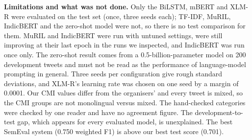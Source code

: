 \documentclass{nle}
\begin{document}
\textbf{Limitations and what was not done.} Only the BiLSTM, mBERT and XLM-R were evaluated on the test set (once, three seeds each); TF-IDF, MuRIL, IndicBERT and the zero-shot model were not, so there is no test comparison for them. MuRIL and IndicBERT were run with untuned settings, were still improving at their last epoch in the
runs we inspected, and IndicBERT was run once only. The zero-shot result comes from a
0.5-billion-parameter model on 200 development tweets and must not be read as the performance of language-model prompting in
general. Three seeds per configuration give rough standard deviations, and XLM-R's learning rate was chosen on one seed by a
margin of 0.0001. Our CMI values differ from the organisers' and every tweet is mixed, so the CMI groups are not monolingual
versus mixed. The hand-checked categories were checked by one reader and have no agreement figure. The development-to-test gap, which appears for every evaluated model, is unexplained. The best SemEval system (0.750 weighted F1) is above our best test score (0.701).
\end{document}
